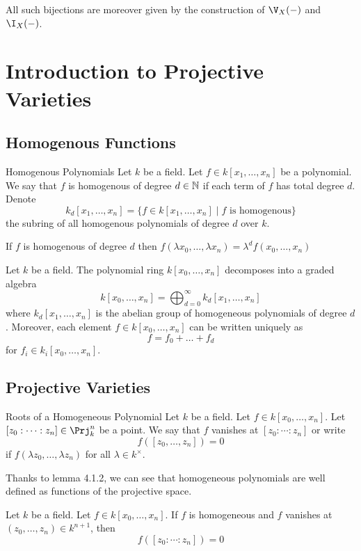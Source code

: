 \documentclass[a4paper]{article}
\begin{document}
All such bijections are moreover given by the construction of $\V_X(-)$ and $\I_X(-)$. 

\pagebreak
\section{Introduction to Projective Varieties}
\subsection{Homogenous Functions}
\begin{defn}{Homogenous Polynomials}{} Let $k$ be a field. Let $f\in k[x_1,\dots,x_n]$ be a polynomial. We say that $f$ is homogenous of degree $d\in\mathbb{N}$ if each term of $f$ has total degree $d$. Denote $$k_d[x_1,\dots,x_n]=\{f\in k[x_1,\dots,x_n]\;|\;f\text{ is homogenous}\}$$ the subring of all homogenous polynomials of degree $d$ over $k$. 
\end{defn}

\begin{lmm}{}{} If $f$ is homogenous of degree $d$ then $f(\lambda x_0,\dots,\lambda x_n)=\lambda^df(x_0,\dots,x_n)$
\end{lmm}

\begin{prp}{}{} Let $k$ be a field. The polynomial ring $k[x_0,\dots,x_n]$ decomposes into a graded algebra $$k[x_0,\dots,x_n]=\bigoplus_{d=0}^\infty k_d[x_1,\dots,x_n]$$ where $k_d[x_1,\dots,x_n]$ is the abelian group of homogeneous polynomials of degree $d$. Moreover, each element $f\in k[x_0,\dots,x_n]$ can be written uniquely as $$f=f_0+\dots+f_d$$ for $f_i\in k_i[x_0,\dots,x_n]$. 
\end{prp}

\subsection{Projective Varieties}
\begin{defn}{Roots of a Homogeneous Polynomial}{} Let $k$ be a field. Let $f\in k[x_0,\dots,x_n]$. Let $[z_0:\cdots:z_n]\in\Prj_k^n$ be a point. We say that $f$ vanishes at $[z_0:\cdots:z_n]$ or write $$f([z_0,\dots,z_n])=0$$ if $f(\lambda z_0,\dots,\lambda z_n)$ for all $\lambda\in k^\times$. 
\end{defn}

Thanks to lemma 4.1.2, we can see that homogeneous polynomials are well defined as functions of the projective space. 

\begin{lmm}{}{} Let $k$ be a field. Let $f\in k[x_0,\dots,x_n]$. If $f$ is homogeneous and $f$ vanishes at $(z_0,\dots,z_n)\in k^{n+1}$, then $$f([z_0:\cdots:z_n])=0$$
\end{lmm}
\end{document}
